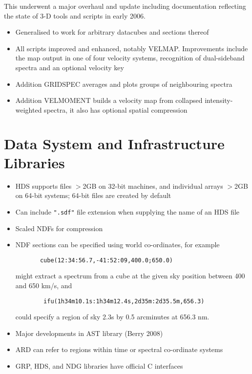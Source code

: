 \documentclass[11pt,twoside]{article}  %
\begin{document}
This underwent a major overhaul and update including documentation
reflecting the state of 3-D tools and scripts in early 2006.

\begin{itemize}
\item Generalised to work for arbitrary datacubes and sections thereof
\item All scripts improved and enhanced, notably {\footnotesize VELMAP}.
Improvements include the map output in one of four velocity systems, 
recognition of dual-sideband spectra and an optional velocity key
\item Addition {\footnotesize GRIDSPEC} averages and plots groups of 
neighbouring spectra
\item Addition {\footnotesize VELMOMENT} builds a velocity map from 
collapsed  intensity-weighted spectra, it also has optional spatial 
compression
\end{itemize}           

\section{Data System and Infrastructure Libraries}

\begin{itemize}
\item HDS supports files $>$2GB on 32-bit machines, and individual arrays 
$>$2GB on 64-bit systems; 64-bit files are created by default
\item Can include \texttt{".sdf"} file extension when supplying the name
of an HDS file
\item Scaled NDFs for compression
\item NDF sections can be specified using world co-ordinates, for example
\begin{verbatim}
       cube(12:34:56.7,-41:52:09,400.0;650.0)
\end{verbatim}
might extract a spectrum from a cube at the given sky position between
400 and 650 km/s, and
\begin{verbatim}
        ifu(1h34m10.1s:1h34m12.4s,2d35m:2d35.5m,656.3)
\end{verbatim}
could specify a region of sky 2.3s by 0.5 arcminutes at 656.3 nm.
\item Major developments in AST library (Berry 2008)
\item ARD can refer to regions within time or spectral co-ordinate systems
\item GRP, HDS, and NDG libraries have official C interfaces
\end{itemize}
\end{document}

